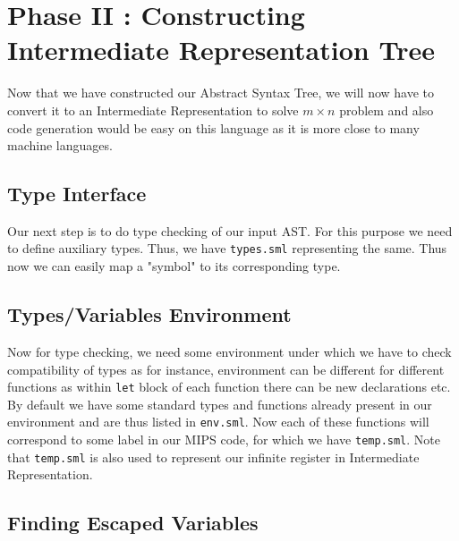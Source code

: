 \chapter{Phase II : Constructing Intermediate Representation Tree}

Now that we have constructed our Abstract Syntax Tree, we will now have to convert it to an Intermediate Representation to solve $m \times n$ problem and also code generation would be easy on this language as it is more close to many machine languages.

\section{Type Interface}


Our next step is to do type checking of our input AST. For this purpose we need to define auxiliary types. Thus, we have \texttt{types.sml} representing the same. Thus now we can easily map a "symbol" to its corresponding type.

\section{Types/Variables Environment}


Now for type checking, we need some environment under which we have to check compatibility of types as for instance, environment can be different for different functions as within \texttt{let} block of each function there can be new declarations etc. By default we have some standard types and functions already present in our environment and are thus listed in \texttt{env.sml}. Now each of these functions will correspond to some label in our MIPS code, for which we have \texttt{temp.sml}. Note that \texttt{temp.sml} is also used to represent our infinite register in Intermediate Representation.

\section{Finding Escaped Variables}



